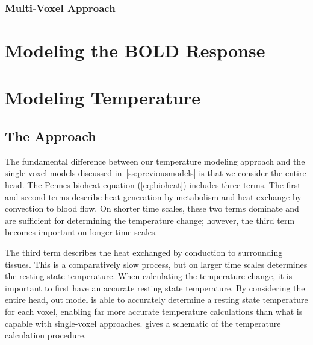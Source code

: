     
    \subsubsection{\label{sss:multivoxel}Multi-Voxel Approach}
  

\section{Modeling the BOLD Response}
\label{sec:modelingBOLD}


\section{Modeling Temperature}
  \subsection{The Approach}
  \label{sec:theapproach}
  The fundamental difference between our temperature modeling approach and the single-voxel models discussed in~\cref{ss:previousmodels} is that we consider the entire head. The Pennes bioheat equation (\cref{eq:bioheat}) \citep{pennes,sotero2011} includes three terms. The first and second terms describe heat generation by metabolism and heat exchange by convection to blood flow.  On shorter time scales, these two terms dominate and are sufficient for determining the temperature change; however, the third term becomes important on longer time scales.
  
  The third term describes the heat exchanged by conduction to surrounding tissues.  This is a comparatively slow process, but on larger time scales determines the resting state temperature.  When calculating the temperature change, it is important to first have an accurate resting state temperature.  By considering the entire head, out model is able to accurately determine a resting state temperature for each voxel, enabling far more accurate temperature calculations than what is capable with single-voxel approaches.   gives a schematic of the temperature calculation procedure.
  
